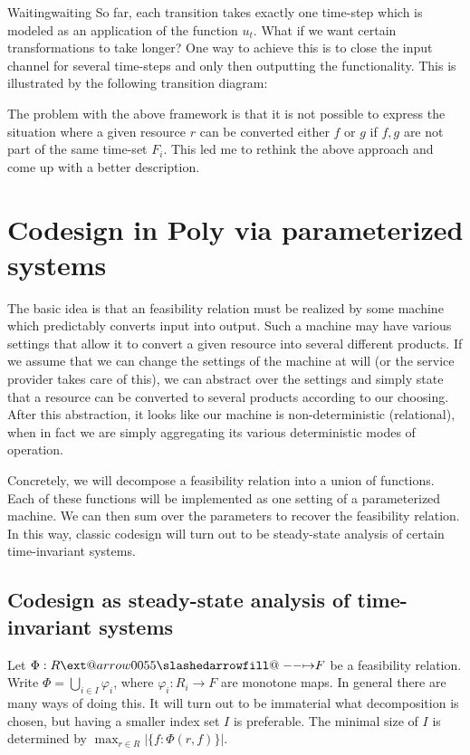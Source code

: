\documentclass[12pt, a4paper]{article}
\makeatletter
\theoremstyle{definition}
\theoremstyle{plain}
\theoremstyle{plain}
\theoremstyle{plain}
\theoremstyle{plain}
\theoremstyle{plain}
\theoremstyle{remark}
\theoremstyle{remark}
\def\slashedarrowfill@#1#2#3#4#5{%
	$\m@th\thickmuskip0mu\medmuskip\thickmuskip\thinmuskip\thickmuskip
	\relax#5#1\mkern-7mu%
	\cleaders\hbox{$#5\mkern-2mu#2\mkern-2mu$}\hfill
	\mathclap{#3}\mathclap{#2}%
	\cleaders\hbox{$#5\mkern-2mu#2\mkern-2mu$}\hfill
	\mkern-7mu#4$%
}
\def\rightslashedarrowfill@{%
	\slashedarrowfill@\relbar\relbar\mapstochar\rightarrow}
\newcommand\xslashedrightarrow[2][]{%
	\ext@arrow 0055{\rightslashedarrowfill@}{#1}{#2}}
\newcommand{\prof}{\xslashedrightarrow{}}
\makeatother
\begin{document}
\begin{tcexample}{Waiting}{waiting}
    So far, each transition takes exactly one time-step which is modeled as an application of the function $u_t$. What if we want certain transformations to take longer? One way to achieve this is to close the input channel for several time-steps and only then outputting the functionality. This is illustrated by the following transition diagram:

\end{tcexample}

The problem with the above framework is that it is not possible to express the situation where a given resource $r$ can be converted either $f$ or $g$ if $f,g$ are not part of the same time-set $F_i$. This led me to rethink the above approach and come up with a better description.

\section{Codesign in \textsf{Poly} via parameterized systems}
The basic idea is that an feasibility relation must be realized by some machine which predictably converts input into output. Such a machine may have various settings that allow it to convert a given resource into several different products. If we assume that we can change the settings of the machine at will (or the service provider takes care of this), we can abstract over the settings and simply state that a resource can be converted to several products according to our choosing. After this abstraction, it looks like our machine is non-deterministic (relational), when in fact we are simply aggregating its various deterministic modes of operation.

Concretely, we will decompose a feasibility relation into a union of functions. Each of these functions will be implemented as one setting of a parameterized machine. We can then sum over the parameters to recover the feasibility relation. In this way, classic codesign will turn out to be steady-state analysis of certain time-invariant systems.

\subsection{Codesign as steady-state analysis of time-invariant systems}
Let $\Phi: R \prof F$ be a feasibility relation. Write $\Phi = \bigcup_{i \in I} \varphi_i$, where $\varphi_i: R_i \rightarrow F$ are monotone maps. In general there are many ways of doing this. It will turn out to be immaterial what decomposition is chosen, but having a smaller index set $I$ is preferable. The minimal size of $I$ is determined by $\max_{r \in R}{| \{f : \Phi(r,f) \} |}$.
\end{document}
